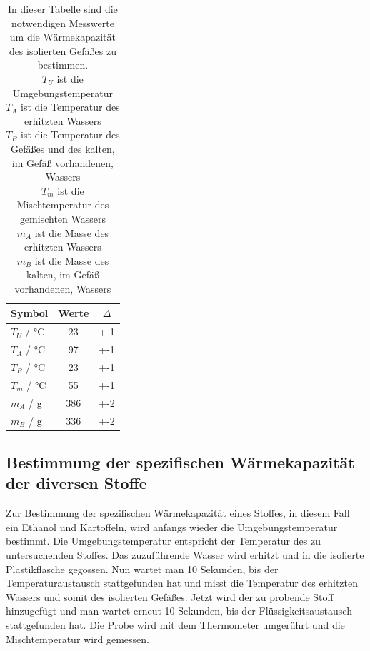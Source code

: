 \documentclass[11pt, ngerman]{scrartcl}
\begin{document}
\begin{table}[H]
	\centering
	\caption{In dieser Tabelle sind die notwendigen Messwerte um die
		Wärmekapazität des isolierten Gefäßes zu bestimmen. \\
		$T_U$ ist die Umgebungstemperatur \\
		$T_A$ ist die Temperatur des erhitzten Wassers \\
		$T_B$ ist die Temperatur des Gefäßes und des kalten, im Gefäß vorhandenen, Wassers \\
		$T_m$ ist die Mischtemperatur des gemischten Wassers \\
		$m_A$ ist die Masse des erhitzten Wassers \\
		$m_B$ ist die Masse des kalten, im Gefäß vorhandenen, Wassers \\
	}
	\label{tab:messwerte_gefass}
	\begin{tabular}{l|S|S}
		Symbol                  & {Werte} & {$\Delta$} \\ \hline
		$T_U$   / \si{\celsius} & 23      & +-1        \\
		$T_A$   / \si{\celsius} & 97      & +-1        \\
		$T_B$   / \si{\celsius} & 23      & +-1        \\
		$T_m$   / \si{\celsius} & 55      & +-1        \\
		$m_A$   / \si{\g}       & 386     & +-2        \\
		$m_B$   / \si{\g}       & 336     & +-2        \\ \hline
	\end{tabular}
\end{table}

\subsection{Bestimmung der spezifischen Wärmekapazität der diversen Stoffe}
Zur Bestimmung der spezifischen Wärmekapazität eines Stoffes, in diesem Fall ein
Ethanol und Kartoffeln, wird anfangs wieder die Umgebungstemperatur
bestimmt. Die Umgebungstemperatur entspricht der Temperatur des zu
untersuchenden Stoffes. Das zuzuführende Wasser wird erhitzt und in die
isolierte Plastikflasche gegossen. Nun wartet man 10 Sekunden, bis der
Temperaturaustausch stattgefunden hat und misst die Temperatur des erhitzten
Wassers und somit des isolierten Gefäßes. Jetzt wird der zu probende Stoff
hinzugefügt und man wartet erneut 10 Sekunden, bis der Flüssigkeitsaustausch
stattgefunden hat. Die Probe wird mit dem Thermometer umgerührt und die
Mischtemperatur wird gemessen.
\end{document}
